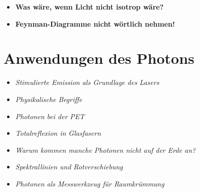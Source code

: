 \begin{tcolorbox}[title=hypothetische Boxen, hypobox]
	\begin{itemize}
		\item \textbf{Was wäre, wenn Licht nicht isotrop wäre?} \dotfill \pageref{box:was wäre nicht isotop}
	\end{itemize}
\end{tcolorbox}

\medskip
\begin{tcolorbox}[title=Warnhinweise, warnbox]
	\begin{itemize}
		\item \textbf{Feynman-Diagramme nicht wörtlich nehmen!} \dotfill \pageref{box:Warnung}
	\end{itemize}
\end{tcolorbox}

\section{Anwendungen des Photons}
\medskip

\begin{tcolorbox}[title=physikalische Boxen, physikbox]
	\begin{itemize}
		\item \emph{Stimulierte Emission als Grundlage des Lasers} \dotfill\pageref{box:grundlagedeslaser}
		\item \emph{Physikalische Begriffe} \dotfill\pageref{box:begriffe}
		\item \emph{Photonen bei der PET} \dotfill\pageref{box:PET}
		\item \emph{Totalreflexion in Glasfasern} \dotfill\pageref{box:glasfaser}
		\item \emph{Warum kommen manche Photonen  nicht auf der Erde an?} \dotfill\pageref{box:photonen auf erde}
		\item \emph{Spektrallinien und Rotverschiebung} \dotfill\pageref{box:spektrallinien}
		\item \emph{Photonen als Messwerkzeug für Raumkrümmung}\dotfill\pageref{box:messwerkzeug}
	\end{itemize}
\end{tcolorbox}



